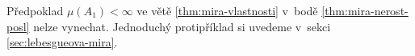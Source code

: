 \begin{remark}
    Předpoklad $\mu(A_1)<\infty$ ve větě \ref{thm:mira-vlastnosti} v~bodě \ref{thm:mira-nerost-posl} nelze vynechat. Jednoduchý protipříklad si uvedeme v~sekci \ref{sec:lebesgueova-mira}.
\end{remark}